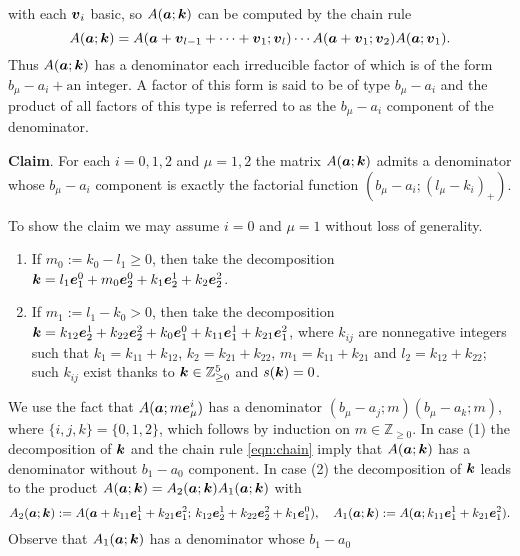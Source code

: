 \documentclass[a4paper,12pt]{article}
\theoremstyle{plain}
\def\Z{\mathbb{Z}}
\def\ba{\mbox{\boldmath $a$}}
\def\be{\mbox{\boldmath $e$}}
\def\bk{\mbox{\boldmath $k$}}
\def\bv{\mbox{\boldmath $v$}}
\begin{document}
with each $\bv_i$ basic, so $A(\ba; \bk)$ can be computed by  
the chain rule    
\begin{equation} \label{eqn:chain}
A(\ba; \bk) = A(\ba+\bv_{l-1}+\cdots+\bv_1; \bv_l) \cdots 
A(\ba+\bv_1; \bv_2) A(\ba; \bv_1). 
\end{equation}
Thus $A(\ba; \bk)$ has a denominator each irreducible factor of which is 
of the form $b_{\mu} - a_i + \mbox{an integer}$. 
A factor of this form is said to be of type $b_{\mu}- a_i$ and the 
product of all factors of this type is referred to as the 
$b_{\mu}-a_i$ component of the denominator.     
\par\smallskip
{\bf Claim}. For each $i = 0,1,2$ and $\mu = 1,2$ the matrix 
$A(\ba; \bk)$ admits a denominator whose $b_{\mu}- a_i$ 
component is exactly the factorial function $(b_{\mu}-a_i; (l_{\mu}-k_i)_+)$. 
\par\smallskip
To show the claim we may assume $i = 0$ and $\mu = 1$ without 
loss of generality.  
\begin{enumerate}
\item If $m_0 := k_0-l_1 \ge 0$, then take the decomposition 
$\bk = l_1 \be_1^0 + m_0 \be_2^0 + k_1 \be_2^1 + k_2 \be_2^2$. 
\item If $m_1 := l_1-k_0 > 0$, then take the decomposition 
$\bk = k_{12} \be_2^1 + k_{22} \be_2^2 + k_0 \be_1^0 + k_{11} \be_1^1 
+ k_{21} \be_1^2$, 
where $k_{ij}$ are nonnegative integers such that $k_1 = k_{11}+k_{12}$, 
$k_2 = k_{21}+k_{22}$, $m_1 = k_{11}+k_{21}$ and $l_2 = k_{12} + k_{22}$;   
such $k_{ij}$ exist thanks to $\bk \in \Z_{\ge0}^5$ and $s(\bk) = 0$. 
\end{enumerate}
We use the fact that $A(\ba; m \be_{\mu}^i)$ has a denominator 
$(b_{\mu}-a_j; m)(b_{\mu}-a_k; m)$, where $\{i, j, k\} = \{0, 1, 2\}$, 
which follows by induction on $m \in \Z_{\ge0}$.  
In case (1) the decomposition of $\bk$ and the chain rule 
\eqref{eqn:chain} imply that $A(\ba; \bk)$ has a denominator 
without $b_1-a_0$ component. 
In case (2) the decomposition of $\bk$ leads to the product 
$A(\ba; \bk) = A_2(\ba; \bk) A_1(\ba; \bk)$ with 
\[
A_2(\ba; \bk) := A(\ba+k_{11} \be_1^1 + k_{21} \be_1^2; \, 
k_{12} \be_2^1 + k_{22} \be_2^2 + k_1 \be_1^0), \quad 
A_1(\ba; \bk) := A(\ba; k_{11} \be_1^1 + k_{21} \be_1^2). 
\]
Observe that $A_1(\ba; \bk)$ has a denominator whose $b_1-a_0$ 
\end{document}
